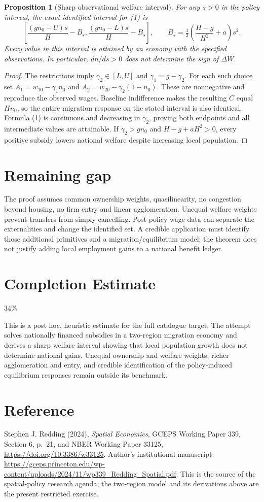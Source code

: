 \documentclass[11pt,a4paper]{article}
\newtheorem{proposition}[theorem]{Proposition}
\theoremstyle{definition}
\theoremstyle{remark}
\begin{document}
\begin{proposition}[Sharp observational welfare interval]
For any $s>0$ in the policy interval, the exact identified interval for (1) is
\[
 \left[\frac{(gn_0-U)s}{H}-B_s,
       \frac{(gn_0-L)s}{H}-B_s\right],\qquad
 B_s=\tfrac12\left(\frac{H-g}{H^2}+a\right)s^2.
\]
Every value in this interval is attained by an economy with the specified observations. In particular, $dn/ds>0$ does not determine the sign of $\Delta W$.
\end{proposition}
\begin{proof}
The restrictions imply $\gamma_2\in[L,U]$ and $\gamma_1=g-\gamma_2$. For each such choice set $A_1=w_{10}-\gamma_1n_0$ and $A_2=w_{20}-\gamma_2(1-n_0)$. These are nonnegative and reproduce the observed wages. Baseline indifference makes the resulting $C$ equal $Hn_0$, so the entire migration response on the stated interval is also identical. Formula (1) is continuous and decreasing in $\gamma_2$, proving both endpoints and all intermediate values are attainable. If $\gamma_2>gn_0$ and $H-g+aH^2>0$, every positive subsidy lowers national welfare despite increasing local population.
\end{proof}

\section{Remaining gap}
The proof assumes common ownership weights, quasilinearity, no congestion beyond housing, no firm entry and linear agglomeration. Unequal welfare weights prevent transfers from simply cancelling. Post-policy wage data can separate the externalities and change the identified set. A credible application must identify those additional primitives and a migration/equilibrium model; the theorem does not justify adding local employment gains to a national benefit ledger.

\section{Completion Estimate}
34\%

This is a post hoc, heuristic estimate for the full catalogue target.
The attempt solves nationally financed subsidies in a two-region migration economy and derives a sharp welfare interval showing that local population growth does not determine national gains. Unequal ownership and welfare weights, richer agglomeration and entry, and credible identification of the policy-induced equilibrium responses remain outside its benchmark.

\section{Reference}
Stephen J. Redding (2024), \emph{Spatial Economics}, GCEPS Working Paper 339, Section 6, p.~21, and NBER Working Paper 33125, \url{https://doi.org/10.3386/w33125}. Author's institutional manuscript: \url{https://gceps.princeton.edu/wp-content/uploads/2024/11/wp339_Redding_Spatial.pdf}. This is the source of the spatial-policy research agenda; the two-region model and its derivations above are the present restricted exercise.
\end{document}
